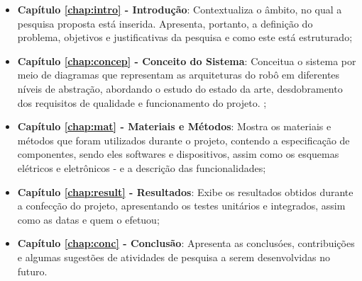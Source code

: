 \begin{itemize}

  \item \textbf{Capítulo \ref{chap:intro} - Introdução}: Contextualiza o âmbito, no qual a pesquisa proposta está inserida. Apresenta, portanto, a definição do problema, objetivos e justificativas da pesquisa e como este \thetypeworkthree está estruturado;

  \item \textbf{Capítulo \ref{chap:concep} - Conceito do Sistema}: Conceitua o sistema por meio de diagramas que representam as arquiteturas do robô em diferentes níveis de abstração, abordando o estudo do estado da arte, desdobramento dos requisitos de qualidade e funcionamento do projeto.
  ;

  \item \textbf{Capítulo \ref{chap:mat} - Materiais e Métodos}: Mostra os materiais e métodos que foram utilizados durante o projeto, contendo a especificação de componentes, sendo eles softwares e dispositivos, assim como os esquemas elétricos e eletrônicos - e a descrição das funcionalidades;
  
  \item \textbf{Capítulo \ref{chap:result} - Resultados}: Exibe os resultados obtidos durante a confecção do projeto, apresentando os testes unitários e integrados, assim como as datas e quem o efetuou;
  

  \item \textbf{Capítulo \ref{chap:conc} - Conclusão}: Apresenta as conclusóes, contribuições
  e algumas sugestões de atividades de pesquisa a serem desenvolvidas no futuro.

\end{itemize}
